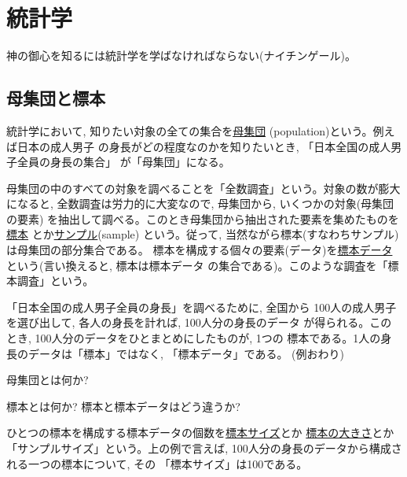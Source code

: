 \chapter{統計学}

神の御心を知るには統計学を学ばなければならない(ナイチンゲール)。\\

\section{母集団と標本}

統計学において, 知りたい対象の全ての集合を\underline{母集団}
 (population)という。例えば日本の成人男子
の身長がどの程度なのかを知りたいとき, 「日本全国の成人男子全員の身長の集合」
が「母集団」になる。

母集団の中のすべての対象を調べることを「全数調査」という。対象の数が膨大になると, 
全数調査は労力的に大変なので, 母集団から, いくつかの対象(母集団の要素)
を抽出して調べる。このとき母集団から抽出された要素を集めたものを
\underline{標本} とか\underline{サンプル}(sample)
という。従って, 当然ながら標本(すなわちサンプル)は母集団の部分集合である。
標本を構成する個々の要素(データ)を\underline{標本データ} 
という(言い換えると, 標本は標本データ
の集合である)。このような調査を「標本調査」という。\\

\begin{exmpl}
「日本全国の成人男子全員の身長」を調べるために, 全国から
100人の成人男子を選び出して, 各人の身長を計れば, 100人分の身長のデータ
が得られる。このとき, 100人分のデータをひとまとめにしたものが, 1つの
標本である。1人の身長のデータは「標本」ではなく, 「標本データ」である。
(例おわり)\end{exmpl}
\mv

\begin{q}\label{q:stat_boshudan_def} 母集団とは何か?\end{q}
\mv

\begin{q}\label{q:stat_sample_def} 標本とは何か? 標本と標本データはどう違うか?
\end{q}
\mv

ひとつの標本を構成する標本データの個数を\underline{標本サイズ}とか
\underline{標本の大きさ}とか「サンプルサイズ」という。上の例で言えば, 
100人分の身長のデータから構成される一つの標本について, その
「標本サイズ」は100である。

